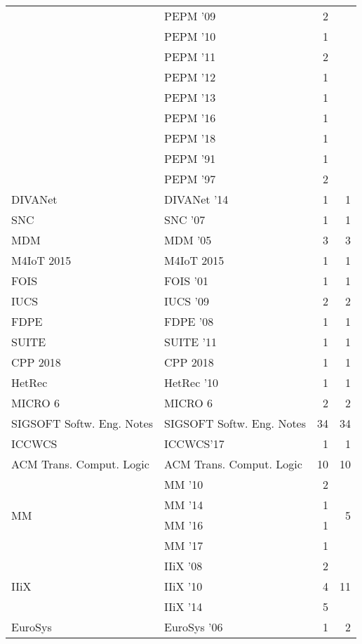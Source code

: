 \begin{table*}[t]
\begin{tabular}{llrr}
& PEPM '09 & 2 &\\
& PEPM '10 & 1 &\\
& PEPM '11 & 2 &\\
& PEPM '12 & 1 &\\
& PEPM '13 & 1 &\\
& PEPM '16 & 1 &\\
& PEPM '18 & 1 &\\
& PEPM '91 & 1 &\\
& PEPM '97 & 2 &\\
\multirow{1}{*}{DIVANet } & DIVANet '14 & 1 & \multirow{1}{*}{1}\\
\multirow{1}{*}{SNC } & SNC '07 & 1 & \multirow{1}{*}{1}\\
\multirow{1}{*}{MDM } & MDM '05 & 3 & \multirow{1}{*}{3}\\
\multirow{1}{*}{M4IoT 2015} & M4IoT 2015 & 1 & \multirow{1}{*}{1}\\
\multirow{1}{*}{FOIS } & FOIS '01 & 1 & \multirow{1}{*}{1}\\
\multirow{1}{*}{IUCS } & IUCS '09 & 2 & \multirow{1}{*}{2}\\
\multirow{1}{*}{FDPE } & FDPE '08 & 1 & \multirow{1}{*}{1}\\
\multirow{1}{*}{SUITE } & SUITE '11 & 1 & \multirow{1}{*}{1}\\
\multirow{1}{*}{CPP 2018} & CPP 2018 & 1 & \multirow{1}{*}{1}\\
\multirow{1}{*}{HetRec } & HetRec '10 & 1 & \multirow{1}{*}{1}\\
\multirow{1}{*}{MICRO 6} & MICRO 6 & 2 & \multirow{1}{*}{2}\\
\multirow{1}{*}{SIGSOFT Softw. Eng. Notes} & SIGSOFT Softw. Eng. Notes & 34 & \multirow{1}{*}{34}\\
\multirow{1}{*}{ICCWCS} & ICCWCS'17 & 1 & \multirow{1}{*}{1}\\
\multirow{1}{*}{ACM Trans. Comput. Logic} & ACM Trans. Comput. Logic & 10 & \multirow{1}{*}{10}\\
\multirow{4}{*}{MM } & MM '10 & 2 & \multirow{4}{*}{5}\\
& MM '14 & 1 &\\
& MM '16 & 1 &\\
& MM '17 & 1 &\\
\multirow{3}{*}{IIiX } & IIiX '08 & 2 & \multirow{3}{*}{11}\\
& IIiX '10 & 4 &\\
& IIiX '14 & 5 &\\
\multirow{2}{*}{EuroSys } & EuroSys '06 & 1 & \multirow{2}{*}{2}\\

\end{tabular}
\end{table*}
